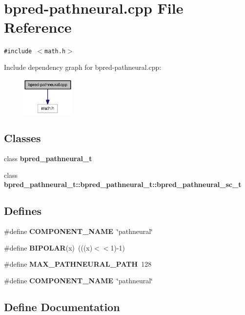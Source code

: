 \section{bpred-pathneural.cpp File Reference}
\label{bpred-pathneural_8cpp}
{\tt \#include $<$math.h$>$}\par


Include dependency graph for bpred-pathneural.cpp:\nopagebreak
\begin{figure}[H]
\begin{center}
\leavevmode
\includegraphics[width=75pt]{bpred-pathneural_8cpp__incl}
\end{center}
\end{figure}
\subsection*{Classes}
\begin{CompactItemize}
\item 
class {\bf bpred\_\-pathneural\_\-t}
\item 
class {\bf bpred\_\-pathneural\_\-t::bpred\_\-pathneural\_\-t::bpred\_\-pathneural\_\-sc\_\-t}
\end{CompactItemize}
\subsection*{Defines}
\begin{CompactItemize}
\item 
\#define {\bf COMPONENT\_\-NAME}~\char`\"{}pathneural\char`\"{}
\item 
\#define {\bf BIPOLAR}(x)~(((x)$<$$<$1)-1)
\item 
\#define {\bf MAX\_\-PATHNEURAL\_\-PATH}~128
\item 
\#define {\bf COMPONENT\_\-NAME}~\char`\"{}pathneural\char`\"{}
\end{CompactItemize}


\subsection{Define Documentation}
